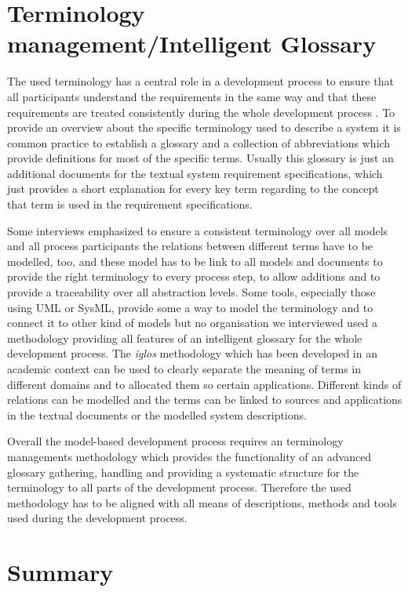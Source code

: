 \documentclass{./template/openetcs_report}
\begin{document}
\section{Terminology management/Intelligent Glossary}

The used terminology has a central role in a development process to ensure that all participants understand the requirements in the same way and that these requirements are treated consistently during the whole development process \citep{Schnieder.2010}. To provide an overview about the specific terminology used to describe a system it is common practice to establish a glossary and a collection of abbreviations which provide definitions for most of the specific terms. Usually this glossary is just an additional documents for the textual system requirement specifications, which just provides a short explanation for every key term regarding to the concept that term is used in the requirement specifications. 

Some interviews emphasized to ensure a consistent terminology over all models and all process participants the relations between different terms have to be modelled, too, and these model has to be link to all models and documents to provide the right terminology to every process step, to allow additions and to provide a traceability over all abstraction levels. Some tools, especially those using UML or SysML, provide some a way to model the terminology and to connect it to other kind of models but no organisation we interviewed used a methodology providing all features of an intelligent glossary for the whole development process. The \textit{iglos} methodology which has been developed in an academic context can be used to clearly separate the meaning of terms in different domains and to allocated them so certain applications. Different kinds of relations can be modelled and the terms can be linked to sources and applications in the textual documents or the modelled system descriptions.

Overall the model-based development process requires an terminology managements methodology which provides the functionality of an advanced glossary gathering, handling and providing a systematic structure for the terminology to all parts of the development process. Therefore the used methodology has to be aligned with all means of descriptions, methods and tools used during the development process. 

\section{Summary}
\end{document}
